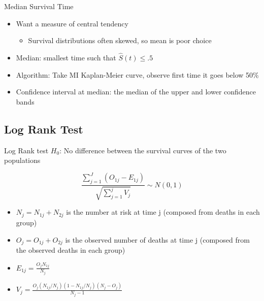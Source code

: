\begin{frame}{Median Survival Time}
 \begin{itemize}
  \item Want a measure of central tendency
  \begin{itemize}
   \item Survival distributions often skewed, so mean is poor choice
  \end{itemize}
  \item Median: smallest time such that $\hat{S}(t)\leq .5$
\item Algorithm: Take MI Kaplan-Meier curve, observe first time it goes below 50\%
\item Confidence interval at median: the median of the upper and lower confidence bands
 \end{itemize}

\end{frame}

\subsection{Log Rank Test}
\begin{frame}{Log Rank test}
$H_0$: No difference between the survival curves of the two populations

$$\frac{\sum_{j=1}^{J}(O_{1j}-E_{1j})}{\sqrt{\sum_{j=1}^{j}V_{j}}}\sim N(0,1)$$
\begin{itemize}
 \item $N_j=N_{1j}+N_{2j}$ is the number at risk at time j (composed from deaths in each group)
 \item $O_j=O_{1j}+O_{2j}$ is the observed number of deaths at time j (composed from the observed deaths in each group)
 \item $E_{1j}=\frac{O_jN_{1j}}{N_j}$
 \item $V_j=\frac{O_j(N_{1j}/N_j)(1-N_{1j}/N_j)(N_{j}-O_{j})}{N_j -1}$
 \end{itemize}
\end{frame}

